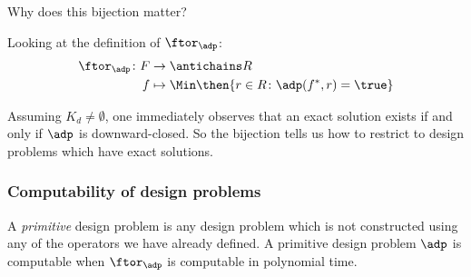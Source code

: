  

Why does this bijection matter?

Looking at the definition of $\ftor_\adp$:
\begin{equation}
    \begin{aligned}
        \ftor_\adp \colon F &\to \antichains R \\
        f &\mapsto \Min \then \{ r \in R \colon \adp(f^*, r) = \true \}
    \end{aligned}
\end{equation}

Assuming $K_d \neq \emptyset$, one immediately observes that an exact solution exists if and only if $\adp$ is downward-closed. So the bijection tells us how to restrict to design problems which have exact solutions.  %

\subsubsection{Computability of design problems}

A \emph{primitive} design problem is any design problem which is not constructed using any of the operators we have already defined. A primitive design problem $\adp$ is computable when $\ftor_\adp$ is computable in polynomial time.

 

 

 

